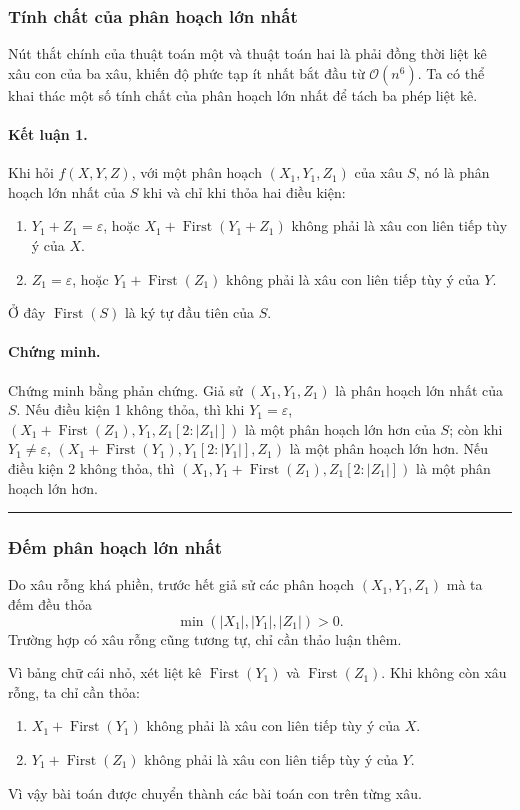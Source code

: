 \documentclass[11pt]{article}
\newcommand{\Oh}{\mathcal{O}}
\newcommand{\qedmark}{\hfill\rule{0.7ex}{0.7ex}}
\begin{document}
\subsubsection{Tính chất của phân hoạch lớn nhất}

Nút thắt chính của thuật toán một và thuật toán hai là phải đồng thời liệt kê
xâu con của ba xâu, khiến độ phức tạp ít nhất bắt đầu từ \(\Oh(n^6)\). Ta có
thể khai thác một số tính chất của phân hoạch lớn nhất để tách ba phép liệt kê.

\paragraph{Kết luận 1.}
Khi hỏi \(f(X,Y,Z)\), với một phân hoạch \((X_1,Y_1,Z_1)\) của xâu \(S\), nó là
phân hoạch lớn nhất của \(S\) khi và chỉ khi thỏa hai điều kiện:
\begin{enumerate}
  \item \(Y_1+Z_1=\varepsilon\), hoặc
  \(X_1+\operatorname{First}(Y_1+Z_1)\) không phải là xâu con liên tiếp tùy ý
  của \(X\).
  \item \(Z_1=\varepsilon\), hoặc \(Y_1+\operatorname{First}(Z_1)\) không phải
  là xâu con liên tiếp tùy ý của \(Y\).
\end{enumerate}
Ở đây \(\operatorname{First}(S)\) là ký tự đầu tiên của \(S\).

\paragraph{Chứng minh.}
Chứng minh bằng phản chứng. Giả sử \((X_1,Y_1,Z_1)\) là phân hoạch lớn nhất của
\(S\). Nếu điều kiện 1 không thỏa, thì khi \(Y_1=\varepsilon\),
\((X_1+\operatorname{First}(Z_1),Y_1,Z_1[2:|Z_1|])\) là một phân hoạch lớn hơn
của \(S\); còn khi \(Y_1\ne\varepsilon\),
\((X_1+\operatorname{First}(Y_1),Y_1[2:|Y_1|],Z_1)\) là một phân hoạch lớn hơn.
Nếu điều kiện 2 không thỏa, thì
\((X_1,Y_1+\operatorname{First}(Z_1),Z_1[2:|Z_1|])\) là một phân hoạch lớn hơn.
\qedmark

\subsubsection{Đếm phân hoạch lớn nhất}

Do xâu rỗng khá phiền, trước hết giả sử các phân hoạch \((X_1,Y_1,Z_1)\) mà ta
đếm đều thỏa
\[
  \min(|X_1|,|Y_1|,|Z_1|)>0.
\]
Trường hợp có xâu rỗng cũng tương tự, chỉ cần thảo luận thêm.

Vì bảng chữ cái nhỏ, xét liệt kê \(\operatorname{First}(Y_1)\) và
\(\operatorname{First}(Z_1)\). Khi không còn xâu rỗng, ta chỉ cần thỏa:
\begin{enumerate}
  \item \(X_1+\operatorname{First}(Y_1)\) không phải là xâu con liên tiếp tùy ý
  của \(X\).
  \item \(Y_1+\operatorname{First}(Z_1)\) không phải là xâu con liên tiếp tùy ý
  của \(Y\).
\end{enumerate}
Vì vậy bài toán được chuyển thành các bài toán con trên từng xâu.
\end{document}
